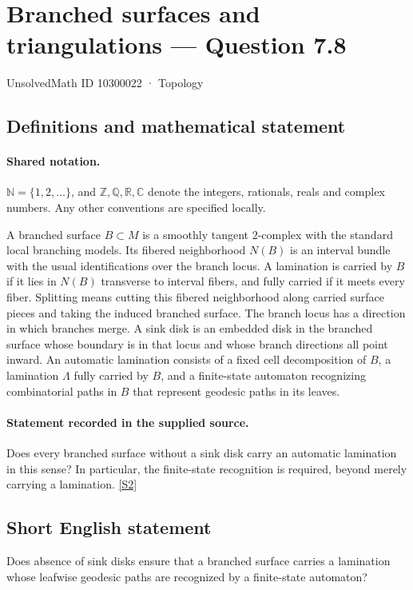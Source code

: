 \documentclass[11pt]{article}
\newcommand{\sref}[2]{\hyperlink{source:#1:#2}{[S#2]}}
\begin{document}
\setcounter{section}{10300021}
\section{Branched surfaces and triangulations — Question 7.8}\label{10300022}
{\small\sffamily UnsolvedMath ID 10300022 · Topology}
\subsection{Definitions and mathematical statement}

\paragraph{Shared notation.}$\mathbb N=\{1,2,\ldots\}$, and $\mathbb Z,\mathbb Q,\mathbb R,\mathbb C$ denote the integers, rationals, reals and complex numbers. Any other conventions are specified locally.


A branched surface $B\subset M$ is a smoothly tangent $2$-complex with the standard local branching models. Its fibered neighborhood $N(B)$ is an interval bundle with the usual identifications over the branch locus. A lamination is carried by $B$ if it lies in $N(B)$ transverse to interval fibers, and fully carried if it meets every fiber. Splitting means cutting this fibered neighborhood along carried surface pieces and taking the induced branched surface. The branch locus has a direction in which branches merge. A sink disk is an embedded disk in the branched surface whose boundary is in that locus and whose branch directions all point inward. An automatic lamination consists of a fixed cell decomposition of $B$, a lamination $\Lambda$ fully carried by $B$, and a finite-state automaton recognizing combinatorial paths in $B$ that represent geodesic paths in its leaves.
\paragraph{Statement recorded in the supplied source.}
Does every branched surface without a sink disk carry an automatic lamination in this sense? In particular, the finite-state recognition is required, beyond merely carrying a lamination. \sref{10300022}{2}
\subsection{Short English statement}
Does absence of sink disks ensure that a branched surface carries a lamination whose leafwise geodesic paths are recognized by a finite-state automaton?
\end{document}
